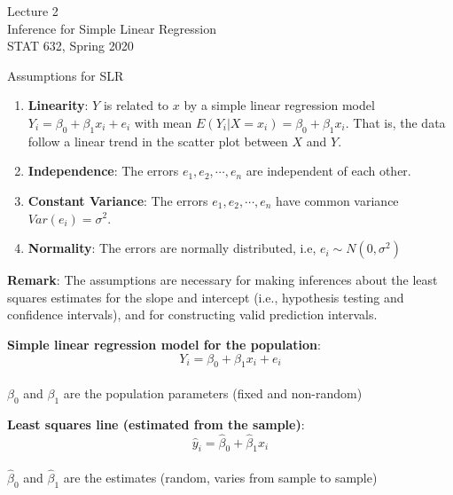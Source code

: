 \documentclass[10pt]{beamer}
\begin{document}
\begin{frame}
\large
Lecture 2\\
Inference for Simple Linear Regression\\
STAT 632, Spring 2020
\end{frame}

\begin{frame}{Assumptions for SLR}
\begin{enumerate}
\item \textbf{Linearity}: $Y$ is related to $x$ by a simple linear regression model $Y_i = \beta_0 + \beta_1 x_i + e_i$ with mean $E(Y_i| X=x_i) = \beta_0 + \beta_1 x_i$.  That is, the data follow a linear trend in the scatter plot between $X$ and $Y$.  
\item \textbf{Independence}:  The errors $e_1, e_2, \cdots, e_n$ are independent of each other.
\item \textbf{Constant Variance}:  The errors $e_1, e_2, \cdots, e_n$ have common variance $Var(e_i) = \sigma^2$.
\item \textbf{Normality}:  The errors are normally distributed, i.e, $e_i \sim N(0,\sigma^2)$
\end{enumerate}
\vspace{10pt}

\textbf{Remark}: The assumptions are necessary for making inferences about the least squares estimates for the slope and intercept (i.e., hypothesis testing and confidence intervals), and for constructing valid prediction intervals.
\end{frame}

\begin{frame}
\textbf{Simple linear regression model for the population}:\\
$$ Y_i = \beta_0 + \beta_1 x_i + e_i $$\\
$\beta_0$ and $\beta_1$ are the population parameters (fixed and non-random)
\vspace{20pt}

\textbf{Least squares line (estimated from the sample)}:\\
$$ \hat{y}_i = \hat{\beta}_0 + \hat{\beta}_1 x_i $$\\
$\hat{\beta}_0$ and $\hat{\beta}_1$ are the estimates (random, varies from sample to sample)
\end{frame}
\end{document}
